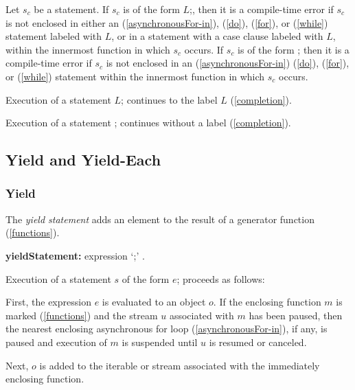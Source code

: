 \documentclass{article}
\newcommand{\code}[1]{{\sf #1}}
\begin{document}
\LMHash{}
Let $s_c$ be a \CONTINUE{} statement.
If $s_c$ is of the form \code{\CONTINUE{} $L$;},
then it is a compile-time error if $s_c$ is not enclosed in either an
\code{\AWAIT{} \FOR{}} (\ref{asynchronousFor-in}),
\DO{} (\ref{do}), \FOR{} (\ref{for}), or \WHILE{} (\ref{while})
statement labeled with $L$, or in a \SWITCH{} statement with a case clause
labeled with $L$, within the innermost function in which $s_c$ occurs.
If $s_c$ is of the form \code{\CONTINUE{};}
then it is a compile-time error if $s_c$ is not enclosed in an
\code{\AWAIT{} \FOR{}} (\ref{asynchronousFor-in})
\DO{} (\ref{do}), \FOR{} (\ref{for}), or \WHILE{} (\ref{while}) statement
within the innermost function in which $s_c$ occurs.

Execution of a \CONTINUE{} statement \code{\CONTINUE{} $L$;} continues to the label $L$ (\ref{completion}).

Execution of a \CONTINUE{} statement \code{\CONTINUE{};} continues without a label (\ref{completion}).


\subsection{ Yield and Yield-Each}

\subsubsection{ Yield}

\LMHash{}
The {\em yield statement} adds an element to the result of a generator function (\ref{functions}).

\begin{grammar}
{\bf yieldStatement:}
   \YIELD{} expression `{\escapegrammar ;}'
      .
\end{grammar}

\LMHash{}
Execution of a statement $s$ of the form \code{\YIELD{} $e$;}  proceeds as follows:

\LMHash{}
First, the expression $e$ is evaluated to an object $o$. If the enclosing function $m$ is marked \ASYNC* (\ref{functions}) and the stream $u$ associated with $m$ has been paused, then the nearest enclosing asynchronous for loop (\ref{asynchronousFor-in}), if any, is paused and execution of $m$ is suspended until $u$ is resumed or canceled.

\LMHash{}
Next, $o$ is added to the iterable or stream associated with the immediately enclosing function.
\end{document}
